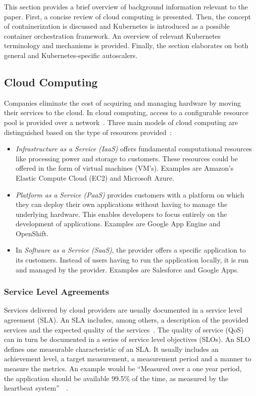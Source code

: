 This section provides a brief overview of background information relevant to the paper. First, a concise review of cloud computing is presented. Then, the concept of containerization is discussed and Kubernetes is introduced as a possible container orchestration framework. An overview of relevant Kubernetes terminology and mechanisms is provided. Finally, the section elaborates on both general and Kubernetes-specific autoscalers.


\subsection{Cloud Computing}
Companies eliminate the cost of acquiring and managing hardware by moving their services to the cloud. In cloud computing, access to a configurable resource pool is provided over a network~\citep{NIST-Could-Def}. Three main models of cloud computing are distinguished based on the type of resources provided~\citep{NIST-Could-Def}: 
\begin{itemize}
    \item \textit{Infrastructure as a Service (IaaS)} offers fundamental computational resources like processing power and storage to customers. These resources could be offered in the form of virtual machines (VM's). Examples are Amazon's Elastic Compute Cloud (EC2) and Microsoft Azure.
    
    \item \textit{Platform as a Service (PaaS)} provides customers with a platform on which they can deploy their own applications without having to manage the underlying hardware. This enables developers to focus entirely on the development of applications. Examples are Google App Engine and OpenShift. 
    
    \item In \textit{Software as a Service (SaaS)}, the provider offers a specific application to its customers. Instead of users having to run the application locally, it is run and managed by the provider. Examples are Salesforce and Google Apps. 
\end{itemize}

\subsubsection{Service Level Agreements}
Services delivered by cloud providers are usually documented in a service level agreement (SLA). An SLA includes, among others, a description of the provided services and the expected quality of the services~\citep{SLA2}. The quality of service (QoS) can in turn be documented in a series of service level objectives (SLOs). An SLO defines one measurable characteristic of an SLA. It usually includes an achievement level, a target measurement, a measurement period and a manner to measure the metrics. An example would be ``Measured over a one year period, the application should be available 99.5\% of the time, as measured by the heartbeat system''~\citep{SLO}~\citep{SLO2}.

